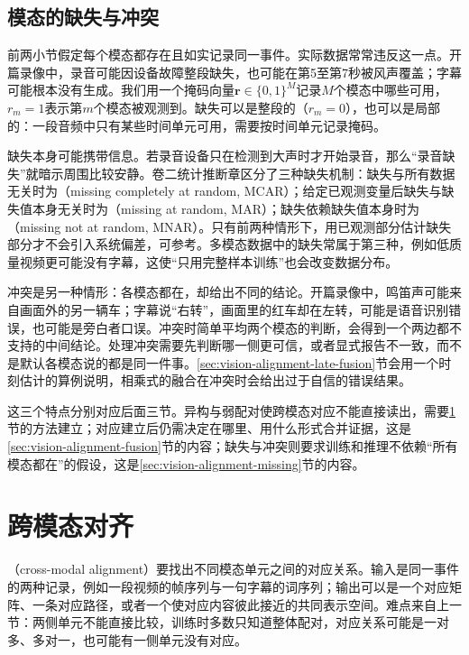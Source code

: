 \subsection{模态的缺失与冲突}
\label{sec:vision-alignment-missing-conflict}

前两小节假定每个模态都存在且如实记录同一事件。实际数据常常违反这一点。开篇录像中，录音可能因设备故障整段缺失，也可能在第5至第7秒被风声覆盖；字幕可能根本没有生成。我们用一个掩码向量$\bm r\in\{0,1\}^{M}$记录$M$个模态中哪些可用，$r_m=1$表示第$m$个模态被观测到。缺失可以是整段的（$r_m=0$），也可以是局部的：一段音频中只有某些时间单元可用，需要按时间单元记录掩码。

缺失本身可能携带信息。若录音设备只在检测到大声时才开始录音，那么“录音缺失”就暗示周围比较安静。卷二统计推断章区分了三种缺失机制：缺失与所有数据无关时为（missing completely at random, MCAR）；给定已观测变量后缺失与缺失值本身无关时为（missing at random, MAR）；缺失依赖缺失值本身时为（missing not at random, MNAR）。只有前两种情形下，用已观测部分估计缺失部分才不会引入系统偏差，可参考。多模态数据中的缺失常属于第三种，例如低质量视频更可能没有字幕，这使“只用完整样本训练”也会改变数据分布。

冲突是另一种情形：各模态都在，却给出不同的结论。开篇录像中，鸣笛声可能来自画面外的另一辆车；字幕说“右转”，画面里的红车却在左转，可能是语音识别错误，也可能是旁白者口误。冲突时简单平均两个模态的判断，会得到一个两边都不支持的中间结论。处理冲突需要先判断哪一侧更可信，或者显式报告不一致，而不是默认各模态说的都是同一件事。\ref{sec:vision-alignment-late-fusion}节会用一个时刻估计的算例说明，相乘式的融合在冲突时会给出过于自信的错误结果。

这三个特点分别对应后面三节。异构与弱配对使跨模态对应不能直接读出，需要\ref{sec:vision-alignment-alignment}节的方法建立；对应建立后仍需决定在哪里、用什么形式合并证据，这是\ref{sec:vision-alignment-fusion}节的内容；缺失与冲突则要求训练和推理不依赖“所有模态都在”的假设，这是\ref{sec:vision-alignment-missing}节的内容。

\section{跨模态对齐}
\label{sec:vision-alignment-alignment}

（cross-modal alignment）要找出不同模态单元之间的对应关系。输入是同一事件的两种记录，例如一段视频的帧序列与一句字幕的词序列；输出可以是一个对应矩阵、一条对应路径，或者一个使对应内容彼此接近的共同表示空间。难点来自上一节：两侧单元不能直接比较，训练时多数只知道整体配对，对应关系可能是一对多、多对一，也可能有一侧单元没有对应。

